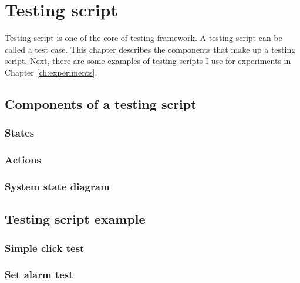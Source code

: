 \chapter{Testing script}
Testing script is one of the core of testing framework.
A testing script can be called a test case.
This chapter describes the components that make up a testing script. Next, there are some examples of testing scripts I use for experiments in Chapter \ref{ch:experiments}.

\section{Components of a testing script}
\subsection{States}

\subsection{Actions}

\subsection{System state diagram}

\section{Testing script example}
\subsection{Simple click test}

\subsection{Set alarm test}